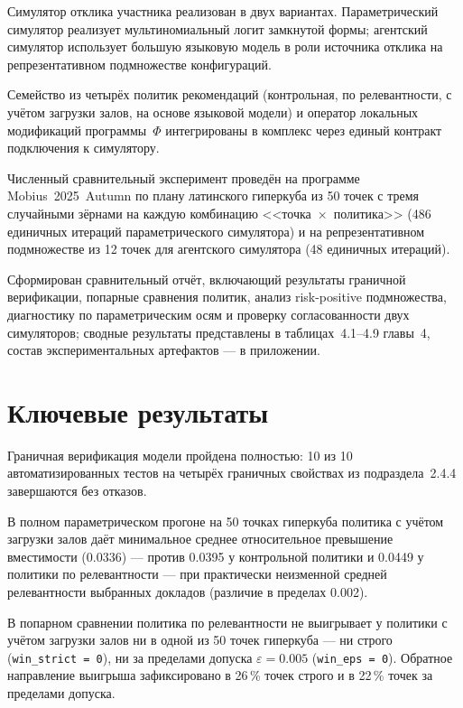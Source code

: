 Симулятор отклика участника реализован в двух вариантах. Параметрический симулятор реализует мультиномиальный логит замкнутой формы; агентский симулятор использует большую языковую модель в роли источника отклика на репрезентативном подмножестве конфигураций.

Семейство из четырёх политик рекомендаций (контрольная, по релевантности, с учётом загрузки залов, на основе языковой модели) и оператор локальных модификаций программы~$\Phi$ интегрированы в комплекс через единый контракт подключения к симулятору.

Численный сравнительный эксперимент проведён на программе Mobius~2025~Autumn по плану латинского гиперкуба из 50 точек с тремя случайными зёрнами на каждую комбинацию <<точка~$\times$~политика>> (486 единичных итераций параметрического симулятора) и на репрезентативном подмножестве из 12 точек для агентского симулятора (48 единичных итераций).

Сформирован сравнительный отчёт, включающий результаты граничной верификации, попарные сравнения политик, анализ risk-positive подмножества, диагностику по параметрическим осям и проверку согласованности двух симуляторов; сводные результаты представлены в таблицах~4.1--4.9 главы~4, состав экспериментальных артефактов --- в приложении.


\section*{Ключевые результаты}

Граничная верификация модели пройдена полностью: 10 из 10 автоматизированных тестов на четырёх граничных свойствах из подраздела~2.4.4 завершаются без отказов.

В полном параметрическом прогоне на 50 точках гиперкуба политика с учётом загрузки залов даёт минимальное среднее относительное превышение вместимости (0.0336) --- против 0.0395 у контрольной политики и 0.0449 у политики по релевантности --- при практически неизменной средней релевантности выбранных докладов (различие в пределах 0.002).

В попарном сравнении политика по релевантности не выигрывает у политики с учётом загрузки залов ни в одной из 50 точек гиперкуба --- ни строго (\texttt{win\_strict = 0}), ни за пределами допуска $\varepsilon = 0.005$ (\texttt{win\_eps = 0}). Обратное направление выигрыша зафиксировано в 26\,\% точек строго и в 22\,\% точек за пределами допуска.

